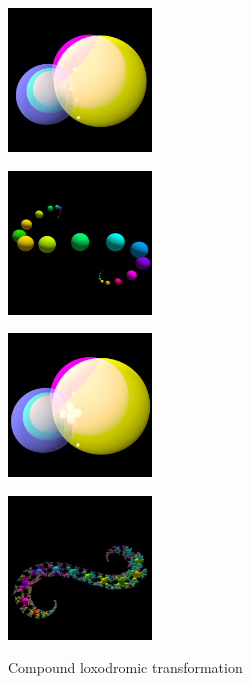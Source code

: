 \begin{figure}[h!tbp]
  \begin{minipage}{0.24\hsize}
   \center
   \includegraphics[width=1.5in, height=1.5in, keepaspectratio]{../img/klein/3diis/compLoxoOneGen.pdf}
   \label{fig:compLoxoGen}
  \end{minipage}
 \hspace*{\fill}
 \begin{minipage}{0.24\hsize}
  \center
  \includegraphics[width=1.5in, height=1.5in, keepaspectratio]{../img/klein/3diis/compLoxoOneOrb.pdf}
   \label{fig:compLoxoOrb}
 \end{minipage}
 \hspace*{\fill}
  \begin{minipage}{0.24\hsize}
   \center
   \includegraphics[width=1.5in, height=1.5in, keepaspectratio]{../img/klein/3diis/compLoxoGen.pdf}
   \label{}
  \end{minipage}
 \hspace*{\fill}
 \begin{minipage}{0.24\hsize}
  \center
  \includegraphics[width=1.5in, height=1.5in, keepaspectratio]{../img/klein/3diis/compLoxoOrb.pdf}
   \label{}
 \end{minipage}
 \hspace*{\fill}
  \caption{Compound loxodromic transformation}
 \label{fig:compLoxo}
\end{figure}

